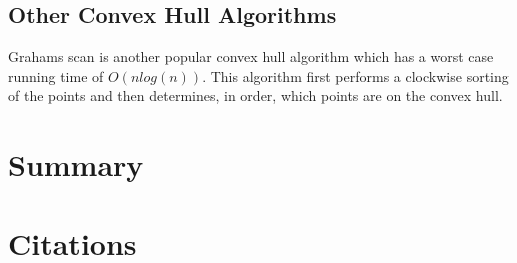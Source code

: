 \documentclass[11pt]{article}
\begin{document}
\subsection{Other Convex Hull Algorithms}
Grahams scan is another popular convex hull algorithm which has a worst case running time of $O(nlog(n))$. This algorithm first performs a clockwise sorting of the points and then determines, in order, which points are on the convex hull.

\section{Summary}

\section{Citations}
\end{document}
